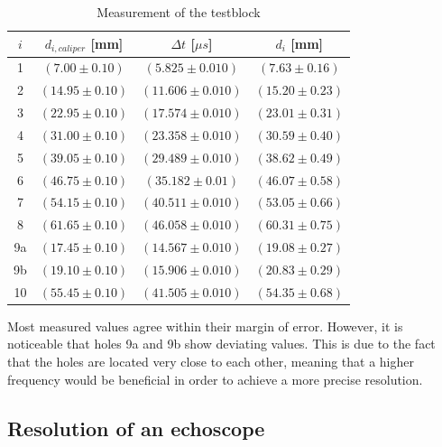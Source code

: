         \begin{table}[H]
            \raggedright
            \begin{tabular}{@{}|c|c|c|c|@{}}
            \hline
            $i$ & $d_{i,caliper}$ [mm] & $\Delta t$ [$\mu s$] & $d_{i}$ [mm] \\
            \hline
            1 & $(7.00 \pm 0.10)$ & $(5.825 \pm 0.010)$ & $(7.63 \pm 0.16)$ \\
            \hline
            2 & $(14.95 \pm 0.10)$ & $(11.606 \pm 0.010)$ & $(15.20 \pm 0.23)$ \\
            \hline
            3 & $(22.95 \pm 0.10)$ & $(17.574 \pm 0.010)$ & $(23.01 \pm 0.31)$ \\
            \hline
            4 & $(31.00 \pm 0.10)$ & $(23.358 \pm 0.010)$ & $(30.59 \pm 0.40)$ \\
            \hline
            5 & $(39.05 \pm 0.10)$ & $(29.489 \pm 0.010) $ & $(38.62 \pm 0.49)$ \\
            \hline
            6 & $(46.75 \pm 0.10)$ & $(35.182\pm 0.01)$ & $(46.07 \pm 0.58)$ \\
            \hline
            7 & $(54.15 \pm 0.10)$ & $(40.511 \pm 0.010)$ & $(53.05 \pm 0.66)$ \\
            \hline
            8 & $(61.65 \pm 0.10)$ & $(46.058 \pm 0.010)$ & $(60.31 \pm 0.75)$ \\
            \hline
            9a & $(17.45 \pm 0.10)$ & $(14.567 \pm 0.010)$ & $(19.08 \pm 0.27)$ \\
            \hline
            9b & $(19.10 \pm 0.10)$ & $(15.906 \pm 0.010)$ & $(20.83 \pm 0.29)$ \\
            \hline
            10 & $(55.45 \pm 0.10)$ & $(41.505 \pm 0.010)$ & $(54.35 \pm 0.68)$ \\
            \hline
            \end{tabular}
        \caption{Measurement of the testblock}
        \label{tab:Testwürfel}
        \end{table}
        \noindent
        Most measured values agree within their margin of error. However, it is noticeable that holes 9a and 9b show deviating values. This is due to the fact that the holes are located very 
        close to each other, meaning that a higher frequency would be beneficial in order to achieve a more precise resolution.

    \subsection{Resolution of an echoscope} \label{subsec:Aufloesungsvermoegen}

